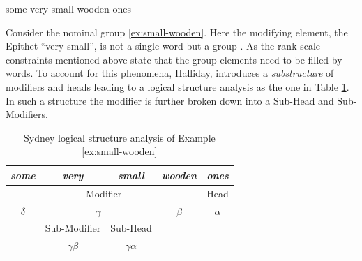 
\begin{exe}
    \ex \label{ex:small-wooden} some very small wooden ones
\end{exe}

Consider the nominal group \ref{ex:small-wooden}. Here the modifying element, the Epithet ``very small'', is not a single word but a group \citep[390--396]{Halliday2013}. As the rank scale constraints mentioned above state that the group elements need to be filled by words. To account for this phenomena, Halliday, introduces a \textit{substructure} of modifiers and heads leading to a logical structure analysis as the one in Table \ref{tab:example-substructure-analisys-logical}. In such a structure the modifier is further broken down into a Sub-Head and Sub-Modifiers. 

\begin{table}[!ht]
    \centering
    \begin{tabular}{c|c|c|cc}
        \hline
        \multicolumn{1}{|c|}{\textit{some}} & \textit{very} & \textit{small} & \multicolumn{1}{c|}{\textit{wooden}} & \multicolumn{1}{c|}{\textit{ones}} \\ \hline
        \multicolumn{4}{|c|}{Modifier}                                                                              & \multicolumn{1}{c|}{Head}          \\ \hline
        \multicolumn{1}{|c|}{$\delta$}             & \multicolumn{2}{c|}{$\gamma$}         & \multicolumn{1}{c|}{$\beta$}               & \multicolumn{1}{c|}{$\alpha$}             \\ \hline
        & Sub-Modifier  & Sub-Head       &                                      &                                    \\ \cline{2-3}    
        \multicolumn{1}{l|}{}               & \multicolumn{1}{c|}{$\gamma\beta$} & \multicolumn{1}{c|}{$\gamma\alpha$} & \multicolumn{1}{l}{}                 & \multicolumn{1}{l}{}               \\ \cline{2-3}
    \end{tabular}
    \caption{Sydney logical structure analysis of Example \ref{ex:small-wooden}}
    \label{tab:example-substructure-analisys-logical}
\end{table}

